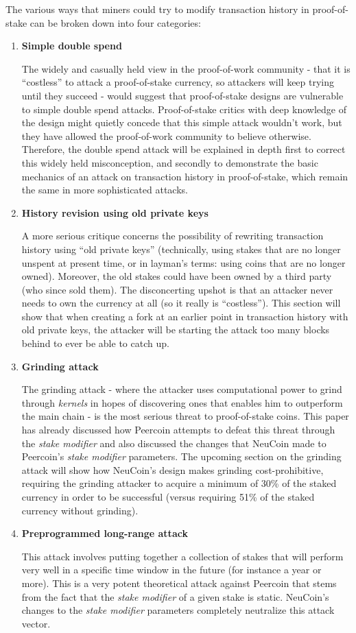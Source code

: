 \documentclass[a4paper,11pt]{article}
\begin{document}
The various ways that miners could try to modify transaction history in proof-of-stake can be broken down into four categories:
\begin{enumerate}
\item{\textbf{Simple double spend}

The widely and casually held view in the proof-of-work community - that it is ``costless'' to attack a proof-of-stake currency, so attackers will keep trying until they succeed - would suggest that proof-of-stake designs are vulnerable to simple double spend attacks. Proof-of-stake critics with deep knowledge of the design might quietly concede that this simple attack wouldn't work, but they have allowed the proof-of-work community to believe otherwise. Therefore, the double spend attack will be explained in depth first to correct this widely held misconception, and secondly to demonstrate the basic mechanics of an attack on transaction history in proof-of-stake, which remain the same in more sophisticated attacks. }

\item{\textbf{History revision using old private keys}

A more serious critique concerns the possibility of rewriting transaction history using ``old private keys'' (technically, using stakes that are no longer unspent at present time, or in layman's terms: using coins that are no longer owned). Moreover, the old stakes could have been owned by a third party (who since sold them). The disconcerting upshot is that an attacker never needs to own the currency at all (so it really is ``costless''). This section will show that when creating a fork at an earlier point in transaction history with old private keys, the attacker will be starting the attack too many blocks behind to ever be able to catch up.  }
\item{\textbf{Grinding attack}

The grinding attack - where the attacker uses computational power to grind through \textit{kernels} in hopes of discovering ones that enables him to outperform the main chain - is the most serious threat to proof-of-stake coins. This paper has already discussed how Peercoin attempts to defeat this threat through the \textit{stake modifier} and also discussed the changes that NeuCoin made to Peercoin's \textit{stake modifier} parameters. The upcoming section on the grinding attack will show how NeuCoin's design makes grinding cost-prohibitive, requiring the grinding attacker to acquire a minimum of 30\% of the staked currency in order to be successful (versus requiring 51\% of the staked currency without grinding). }
\item{\textbf{Preprogrammed long-range attack}

This attack involves putting together a collection of stakes that will perform very well in a specific time window in the future (for instance a year or more). This is a very potent theoretical attack against Peercoin that stems from the fact that the \textit{stake modifier} of a given stake is static. NeuCoin's changes to the \textit{stake modifier} parameters completely neutralize this attack vector.}
\end{enumerate}
\end{document}

